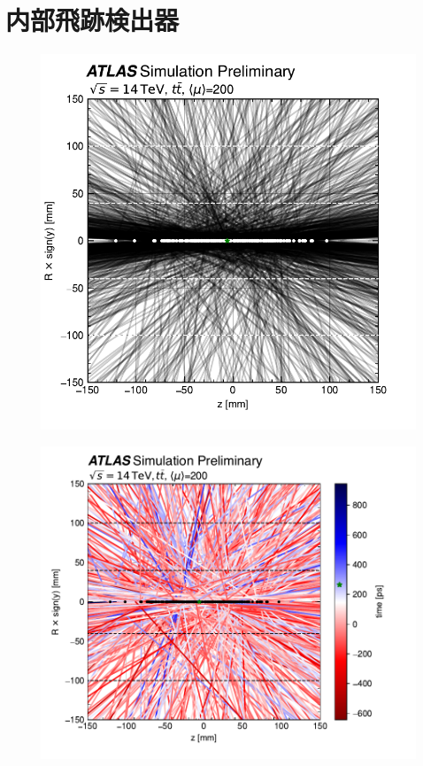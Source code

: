 \section{内部飛跡検出器}

\begin{figure}[h]   %
    \begin{minipage}[b]{0.5\linewidth}
        \centering
        \includegraphics[scale=0.5]{fig/ch1/ATLAS_3Dtrack.pdf}
        \label{fg:ATLAS_3Dtrack}
    \end{minipage}
    \begin{minipage}[b]{0.5\linewidth}
        \centering
        \includegraphics[scale=0.5]{fig/ch1/ATLAS_4Dtrack.pdf}

\end{minipage}
\end{figure}
